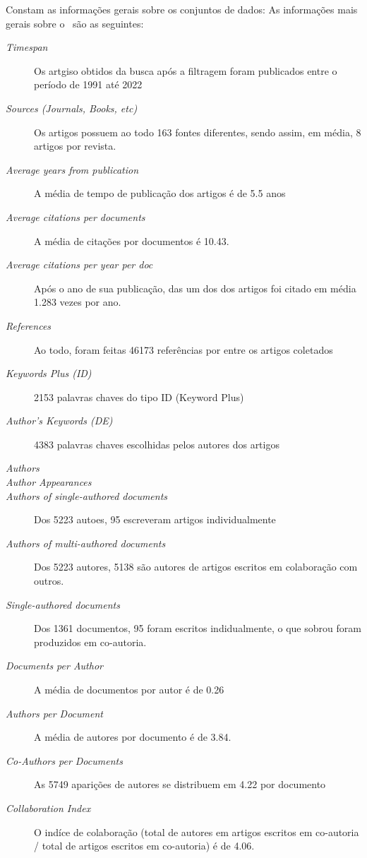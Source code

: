 Constam as informações gerais sobre os conjuntos de dados:
As informações mais gerais sobre o \dataset\   são as seguintes:
\begin{description}
    \item [\textit{Timespan}] Os artgiso obtidos da busca após a filtragem foram publicados entre o período de 1991 até 2022
    \item [\textit{Sources (Journals, Books, etc)}] Os artigos possuem ao todo 163 fontes diferentes, sendo assim, em média, 8 artigos por revista.
    \item [\textit{Average years from publication}] A média de tempo de publicação dos artigos é de 5.5 anos
    \item [\textit{Average citations per documents}] A média de citações por documentos é 10.43.
    \item [\textit{Average citations per year per doc}] Após o ano de sua publicação, das um dos dos artigos foi citado em média 1.283 vezes por ano.
    \item [\textit{References}] Ao todo, foram feitas 46173  referências por entre os artigos coletados
    \item [\textit{Keywords Plus (ID)}] 2153 palavras chaves do tipo ID (Keyword Plus)
    \item [\textit{Author's Keywords (DE)}]  4383 palavras chaves escolhidas pelos autores dos artigos

    \item [\textit{Authors}]  
    \item [\textit{Author Appearances}] 
    \item [\textit{Authors of single-authored documents}] Dos 5223 autoes, 95 escreveram artigos individualmente
    \item [\textit{Authors of multi-authored documents}] Dos 5223 autores, 5138 são autores de artigos escritos em colaboração com outros.
    \item [\textit{Single-authored documents}] Dos 1361 documentos, 95 foram escritos indidualmente, o que sobrou foram produzidos em co-autoria.
    \item [\textit{Documents per Author}] A média de documentos por autor é de 0.26
    \item [\textit{Authors per Document}] A média de autores por documento é de 3.84.
    \item [\textit{Co-Authors per Documents}] As 5749 aparições de autores se distribuem em 4.22 por documento
    \item [\textit{Collaboration Index}] O indíce de colaboração (total de autores em artigos escritos em co-autoria / total de artigos escritos em co-autoria) é de 4.06.
\end{description}

